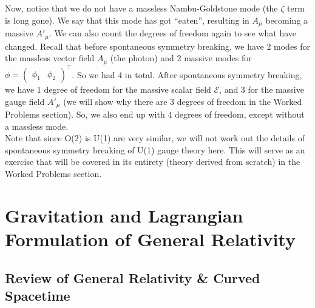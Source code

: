 \documentclass[a4paper,11pt]{article}
\numberwithin{equation}{section}
\theoremstyle{definition}
\begin{document}
Now, notice that we do not have a massless Nambu-Goldstone mode (the $\zeta$ term is long gone). We say that this mode has got ``eaten'', resulting in $A_\mu$ becoming a massive $A'_\mu$. We can also count the degrees of freedom again to see what have changed. Recall that before spontaneous symmetry breaking, we have 2 modes for the massless vector field $A_\mu$ (the photon) and 2 massive modes for $\phi = \begin{pmatrix}
\phi_1 & \phi_2
\end{pmatrix}^\top$. So we had 4 in total. After spontaneous symmetry breaking, we have 1 degree of freedom for the massive scalar field $\mathcal{E}$, and 3 for the massive gauge field $A'_\mu$ (we will show why there are 3 degrees of freedom in the Worked Problems section). So, we also end up with 4 degrees of freedom, except without a massless mode. \\

Note that since O(2) is U(1) are very similar, we will not work out the details of spontaneous symmetry breaking of U(1) gauge theory here. This will serve as an exercise that will be covered in its entirety (theory derived from scratch) in the Worked Problems section. \\




































\newpage

\section{Gravitation and Lagrangian Formulation of General Relativity}

\subsection{Review of General Relativity \& Curved Spacetime}
\end{document}
